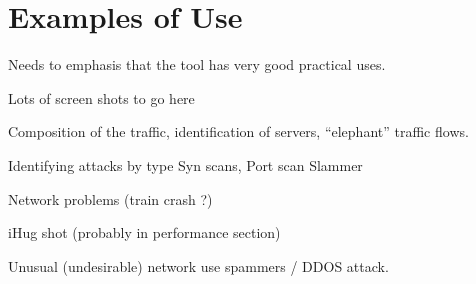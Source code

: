 \section{Examples of Use}
\label{examples}

Needs to emphasis that the tool has very good practical uses.

Lots of screen shots to go here

Composition of the traffic, identification of servers, ``elephant'' traffic flows.  


Identifying attacks by type
Syn scans,
Port scan
Slammer

Network problems (train crash ?)

iHug shot (probably in performance section)

Unusual (undesirable) network use spammers / DDOS attack.





